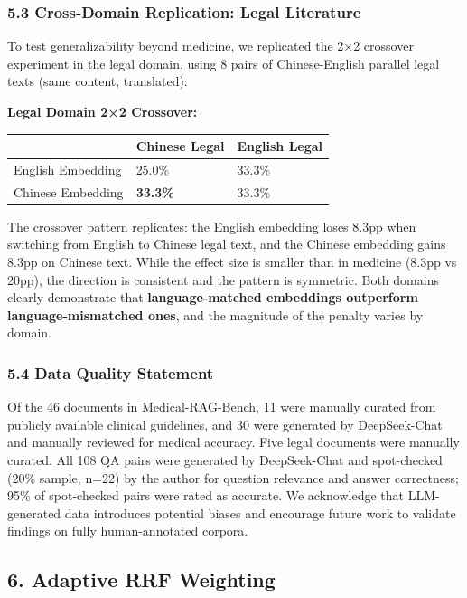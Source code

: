 \documentclass[
]{article}
\begin{document}
\subsubsection{5.3 Cross-Domain Replication: Legal
Literature}\label{cross-domain-replication-legal-literature}

To test generalizability beyond medicine, we replicated the 2×2
crossover experiment in the legal domain, using 8 pairs of
Chinese-English parallel legal texts (same content, translated):

\textbf{Legal Domain 2×2 Crossover:}

\begin{longtable}[]{@{}lll@{}}
\toprule\noalign{}
& Chinese Legal & English Legal \\
\midrule\noalign{}
\endhead
\bottomrule\noalign{}
\endlastfoot
English Embedding & 25.0\% & 33.3\% \\
Chinese Embedding & \textbf{33.3\%} & 33.3\% \\
\end{longtable}

The crossover pattern replicates: the English embedding loses 8.3pp when
switching from English to Chinese legal text, and the Chinese embedding
gains 8.3pp on Chinese text. While the effect size is smaller than in
medicine (8.3pp vs 20pp), the direction is consistent and the pattern is
symmetric. Both domains clearly demonstrate that
\textbf{language-matched embeddings outperform language-mismatched
ones}, and the magnitude of the penalty varies by domain.

\subsubsection{5.4 Data Quality Statement}\label{data-quality-statement}

Of the 46 documents in Medical-RAG-Bench, 11 were manually curated from
publicly available clinical guidelines, and 30 were generated by
DeepSeek-Chat and manually reviewed for medical accuracy. Five legal
documents were manually curated. All 108 QA pairs were generated by
DeepSeek-Chat and spot-checked (20\% sample, n=22) by the author for
question relevance and answer correctness; 95\% of spot-checked pairs
were rated as accurate. We acknowledge that LLM-generated data
introduces potential biases and encourage future work to validate
findings on fully human-annotated corpora.

\subsection{6. Adaptive RRF Weighting}\label{adaptive-rrf-weighting}
\end{document}
